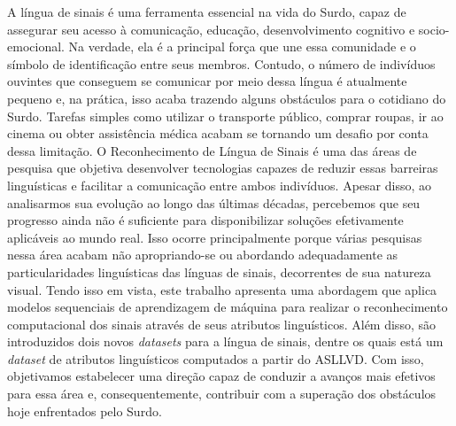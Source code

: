 \begin{resumo}[Resumo]
  \noindent
  A língua de sinais é uma ferramenta essencial na vida do Surdo, capaz de assegurar seu acesso à comunicação, educação, desenvolvimento cognitivo e socio-emocional.
  Na verdade, ela é a principal força que une essa comunidade e o símbolo de identificação entre seus membros.
  Contudo, o número de indivíduos ouvintes que conseguem se comunicar por meio dessa língua é atualmente pequeno e, na prática, isso acaba trazendo alguns obstáculos para o cotidiano do Surdo.
  Tarefas simples como utilizar o transporte público, comprar roupas, ir ao cinema ou obter assistência médica acabam se tornando um desafio por conta dessa limitação.
  O Reconhecimento de Língua de Sinais é uma das áreas de pesquisa que objetiva desenvolver tecnologias capazes de reduzir essas barreiras linguísticas e facilitar a comunicação entre ambos indivíduos.
  Apesar disso, ao analisarmos sua evolução ao longo das últimas décadas, percebemos que seu progresso ainda não é suficiente para disponibilizar soluções efetivamente aplicáveis ao mundo real.
  Isso ocorre principalmente porque várias pesquisas nessa área acabam não apropriando-se ou abordando adequadamente as particularidades linguísticas das línguas de sinais, decorrentes de sua natureza visual.
  Tendo isso em vista, este trabalho apresenta uma abordagem que aplica modelos sequenciais de aprendizagem de máquina para realizar o reconhecimento computacional dos sinais através de seus atributos linguísticos. Além disso, são introduzidos dois novos \textit{datasets} para a língua de sinais, dentre os quais está um \textit{dataset} de atributos linguísticos computados a partir do ASLLVD.
  Com isso, objetivamos estabelecer uma direção capaz de conduzir a avanços mais efetivos para essa área e, consequentemente, contribuir com a superação dos obstáculos hoje enfrentados pelo Surdo.




\end{resumo}
